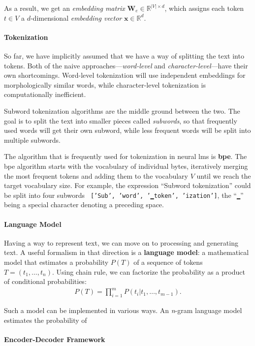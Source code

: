 As a result, we get an \textit{embedding matrix} $\mathbf{W}_e \in \mathbb{R}^{|V|\times d}$, which assigns each token $t \in V$ a $d$-dimensional \textit{embedding vector} $\mathbf{x} \in \mathbb{R}^{d}$.

\paragraph{Tokenization} So far, we have implicitly assumed that we have a way of splitting the text into tokens. Both of the naive approaches---\textit{word-level} and \textit{character-level}---have their own shortcomings. Word-level tokenization will use independent embeddings for morphologically similar words, while character-level tokenization is computationally inefficient.

Subword tokenization algorithms are the middle ground between the two. The goal is to split the text into smaller pieces called \emph{subwords}, so that frequently used words will get their own subword, while less frequent words will be split into multiple subwords.

The algorithm that is frequently used for tokenization in neural \acp{lm} is \textbf{\ac{bpe}}. The \ac{bpe} algorithm starts with the vocabulary of individual bytes, iteratively merging the most frequent tokens and adding them to the vocabulary $V$ until we reach the target vocabulary size. For example, the expression ``Subword tokenization'' could be split into four subwords \texttt{ ['Sub', 'word', '▁token', 'ization']}, the ``\texttt{▁}'' being a special character denoting a preceding space.

\paragraph{Language Model} Having a way to represent text, we can move on to processing and generating text. A useful formalism in that direction is a \textbf{language model}: a mathematical model that estimates a probability $P(T)$ of a sequence of tokens $T = (t_1, \ldots, t_n)$. Using chain rule, we can factorize the probability as a product of conditional probabilities:
\begin{align}
    P(T) = \prod_{i=1}^m P(t_i|t_1, \hdots,t_{m-1}).
\end{align}

Such a model can be implemented in various ways. An \emph{n}-gram language model estimates the probability of

\paragraph{Encoder-Decoder Framework}

